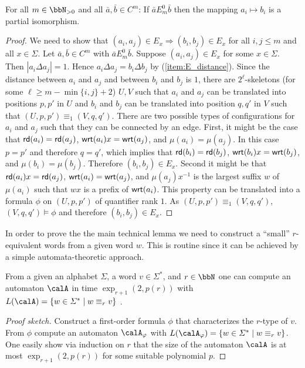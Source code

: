 \begin{lemma}\label{lem:partial_isomorphism}
	For all $m\in\bbN_{>0}$ and all $\bar{a},\bar{b} \in C^m$: If $\bar{a} E^0_m \bar{b}$ then the mapping $a_i \mapsto b_i$ is a partial isomorphism.
\end{lemma}
\begin{proof}
	We need to show that $(a_i,a_j)\in E_x \Rightarrow (b_i,b_j)\in E_x$  for all $i,j\leq m$ and all $x\in\Sigma$.
	Let $\bar{a}, \bar{b} \in C^m$ with $\bar{a} E^0_m \bar{b}$. Suppose  $(a_i,a_j) \in E_x$ for some $x\in \Sigma$. Then $|a_i\Delta a_j| = 1$. Hence $a_i\Delta a_j = b_i\Delta b_j$ by (\ref{item:E_distance}). 
	Since the distance between $a_i$ and $a_j$ and between $b_i$ and $b_j$ is $1$, there are $2^\ell$-skeletons (for some $\ell \geq m-\min\{i,j\}+2$) $U,V$ such that 
	$a_i$ and $a_j$ can be translated into positions $p, p'$ in $U$ and  $b_i$ and $b_j$ can be translated into position $q, q'$ in $V$ such that $(U,p,p') \equiv_1 (V,q,q')$. 
	There are two possible types of configurations for $a_i$ and $a_j$ such that they can be connected by an edge. First, it might be the case  that $\mathsf{rd}(a_i) = \mathsf{rd}(a_j)$,
	$\mathsf{wrt}(a_i)x = \mathsf{wrt}(a_j)$, and $\mu(a_i) = \mu(a_j)$. In this case $p=p'$ and therefore $q=q'$, which implies that $\mathsf{rd}(b_i) = \mathsf{rd}(b_j)$,
	$\mathsf{wrt}(b_i)x = \mathsf{wrt}(b_j)$, and $\mu(b_i) = \mu(b_j)$. Therefore $(b_i,b_j) \in E_x$.
	Second  it might be that $\mathsf{rd}(a_i)x = \mathsf{rd}(a_j)$,
	$\mathsf{wrt}(a_i) = \mathsf{wrt}(a_j)$, and $\mu(a_j)x^{-1}$ is the largest suffix $w$ of $\mu(a_i)$ such that $wx$ is a prefix of $\mathsf{wrt}(a_i)$.  This property can be translated into a formula $\phi$
	on $(U, p, p')$ of quantifier rank $1$. As $(U,p,p') \equiv_1 (V, q,q')$, $(V,q,q') \models \phi$ and therefore $(b_i,b_j)\in E_x$. 
\end{proof}

In order to prove the the main technical lemma we need to construct a ``small'' $r$-equivalent words from a given word $w$. This is routine since it can be achieved by a simple automata-theoretic approach. 
\begin{lemma}\label{lem:r-equiv_word_construction}
	From a given an alphabet $\Sigma$, a word $v\in\Sigma^\ast$, and $r\in\bbN$ one can compute an automaton $\calA$ in time $\exp_{r+1}(2, p(r))$ with $L(\calA) = \{w\in \Sigma^\ast\mid w\equiv_r v \}$ .  
\end{lemma}
\begin{proof}[Proof sketch]
	Construct a first-order formula $\phi$ that characterizes the $r$-type of $v$. From $\phi$ compute an automaton $\calA_\phi$ with $L(\calA_\phi) = \{ w\in\Sigma^\ast \mid w\equiv_r v \}$. One easily show via induction on $r$ that the size of the automaton $\calA$ is at most
	$\exp_{r+1}(2, p(r))$ for some suitable polynomial $p$.
\end{proof}


